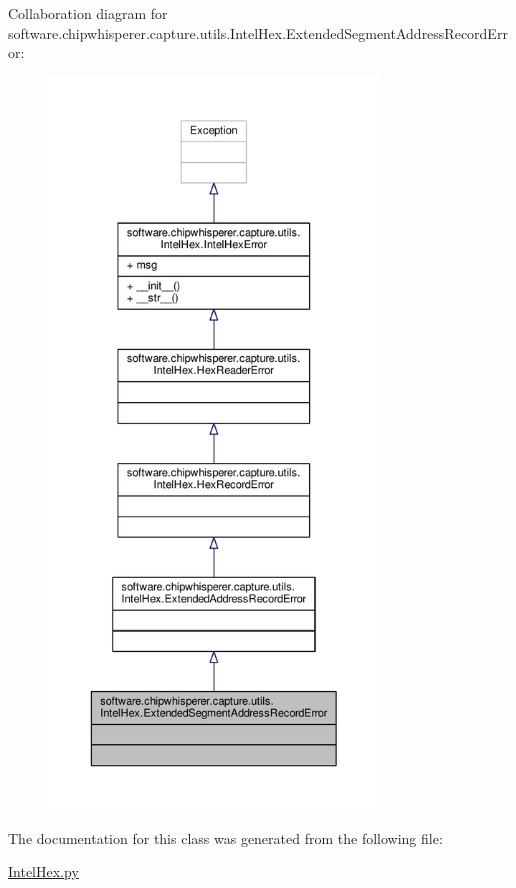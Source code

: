 Collaboration diagram for software.\+chipwhisperer.\+capture.\+utils.\+Intel\+Hex.\+Extended\+Segment\+Address\+Record\+Error\+:\nopagebreak
\begin{figure}[H]
\begin{center}
\leavevmode
\includegraphics[height=550pt]{d1/dbd/classsoftware_1_1chipwhisperer_1_1capture_1_1utils_1_1IntelHex_1_1ExtendedSegmentAddressRecordError__coll__graph}
\end{center}
\end{figure}


The documentation for this class was generated from the following file\+:\begin{DoxyCompactItemize}
\item 
\hyperlink{IntelHex_8py}{Intel\+Hex.\+py}\end{DoxyCompactItemize}
